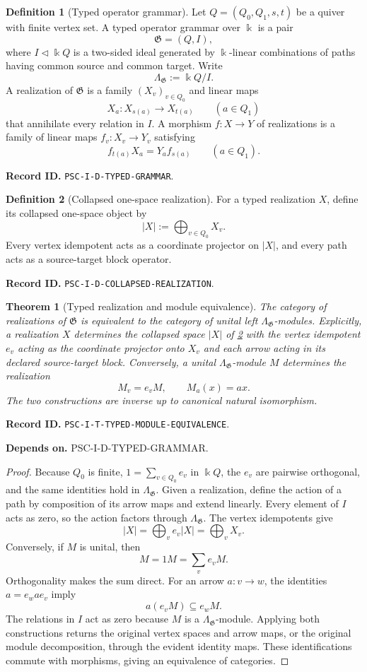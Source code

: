 \documentclass[11pt]{article}
\newtheorem{theorem}{Theorem}[section]
\theoremstyle{definition}
\newtheorem{definition}[definition]{Definition}
\theoremstyle{remark}
\newcommand{\bbk}{\Bbbk}
\newcommand{\RecordID}[1]{\par\smallskip\noindent\begingroup\footnotesize\color{PSCGray}\raggedright\textbf{Record ID.} \nolinkurl{#1}.\par\endgroup}
\newcommand{\Depends}[1]{\par\noindent\begingroup\footnotesize\color{PSCGray}\raggedright\textbf{Depends on.} #1\par\endgroup}
\begin{document}
\begin{definition}[Typed operator grammar]
\label{def:typed-grammar}
Let $Q=(Q_0,Q_1,s,t)$ be a quiver with finite vertex set.  A typed operator grammar over $\bbk$ is a pair
\[
\mathfrak G=(Q,I),
\]
where $I\triangleleft \bbk Q$ is a two-sided ideal generated by $\bbk$-linear combinations of paths having common source and common target.  Write
\[
\Lambda_{\mathfrak G}:=\bbk Q/I.
\]
A realization of $\mathfrak G$ is a family $(X_v)_{v\in Q_0}$ and linear maps
\[
X_a:X_{s(a)}\longrightarrow X_{t(a)}
\qquad(a\in Q_1)
\]
that annihilate every relation in $I$.  A morphism $f:X\to Y$ of realizations is a family of linear maps $f_v:X_v\to Y_v$ satisfying
\[
f_{t(a)}X_a=Y_af_{s(a)}
\qquad(a\in Q_1).
\]
\end{definition}
\RecordID{PSC-I-D-TYPED-GRAMMAR}

\begin{definition}[Collapsed one-space realization]
\label{def:collapsed-realization}
For a typed realization $X$, define its collapsed one-space object by
\[
|X|:=\bigoplus_{v\in Q_0}X_v.
\]
Every vertex idempotent acts as a coordinate projector on $|X|$, and every path acts as a source-target block operator.
\end{definition}
\RecordID{PSC-I-D-COLLAPSED-REALIZATION}

\begin{theorem}[Typed realization and module equivalence]
\label{thm:typed-module-equivalence}
The category of realizations of $\mathfrak G$ is equivalent to the category of unital left $\Lambda_{\mathfrak G}$-modules.  Explicitly, a realization $X$ determines the collapsed space $|X|$ of \cref{def:collapsed-realization}
with the vertex idempotent $e_v$ acting as the coordinate projector onto $X_v$ and each arrow acting in its declared source-target block.  Conversely, a unital $\Lambda_{\mathfrak G}$-module $M$ determines the realization
\[
M_v=e_vM,
\qquad
M_a(x)=ax.
\]
The two constructions are inverse up to canonical natural isomorphism.
\end{theorem}
\RecordID{PSC-I-T-TYPED-MODULE-EQUIVALENCE}
\Depends{PSC-I-D-TYPED-GRAMMAR.}

\begin{proof}
Because $Q_0$ is finite, $1=\sum_{v\in Q_0}e_v$ in $\bbk Q$, the $e_v$ are pairwise orthogonal, and the same identities hold in $\Lambda_{\mathfrak G}$.  Given a realization, define the action of a path by composition of its arrow maps and extend linearly.  Every element of $I$ acts as zero, so the action factors through $\Lambda_{\mathfrak G}$.  The vertex idempotents give
\[
|X|=\bigoplus_v e_v|X|=\bigoplus_vX_v.
\]
Conversely, if $M$ is unital, then
\[
M=1M=\sum_ve_vM.
\]
Orthogonality makes the sum direct.  For an arrow $a:v\to w$, the identities $a=e_wae_v$ imply
\[
a(e_vM)\subseteq e_wM.
\]
The relations in $I$ act as zero because $M$ is a $\Lambda_{\mathfrak G}$-module.  Applying both constructions returns the original vertex spaces and arrow maps, or the original module decomposition, through the evident identity maps.  These identifications commute with morphisms, giving an equivalence of categories.
\end{proof}
\end{document}
